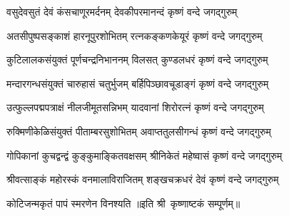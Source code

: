 
\twolineshloka
{वसुदेवसुतं देवं कंसचाणूरमर्दनम्}
{देवकीपरमानन्दं कृष्णं वन्दे जगद्गुरुम्}

\twolineshloka
{अतसीपुष्पसङ्काशं हारनूपुरशोभितम्}
{रत्नकङ्कणकेयूरं कृष्णं वन्दे जगद्गुरुम्}

\twolineshloka
{कुटिलालकसंयुक्तं पूर्णचन्द्रनिभाननम्}
{विलसत् कुण्डलधरं कृष्णं वन्दे जगद्गुरुम्}

\twolineshloka
{मन्दारगन्धसंयुक्तं चारुहासं चतुर्भुजम्}
{बर्हिपिञ्छावचूडाङ्गं कृष्णं वन्दे जगद्गुरुम्}

\twolineshloka
{उत्फुल्लपद्मपत्राक्षं नीलजीमूतसन्निभम्}
{यादवानां शिरोरत्नं कृष्णं वन्दे जगद्गुरुम्}

\twolineshloka
{रुक्मिणीकेळिसंयुक्तं पीताम्बरसुशोभितम्}
{अवाप्ततुलसीगन्धं कृष्णं वन्दे जगद्गुरुम्}

\twolineshloka
{गोपिकानां कुचद्वन्द्वं कुङ्कुमाङ्कितवक्षसम्}
{श्रीनिकेतं महेष्वासं कृष्णं वन्दे जगद्गुरुम्}

\twolineshloka
{श्रीवत्साङ्कं महोरस्कं वनमालाविराजितम्}
{शङ्खचक्रधरं देवं कृष्णं वन्दे जगद्गुरुम्}

{कोटिजन्मकृतं पापं स्मरणेन विनश्यति}
॥इति श्री~कृष्णाष्टकं सम्पूर्णम्॥